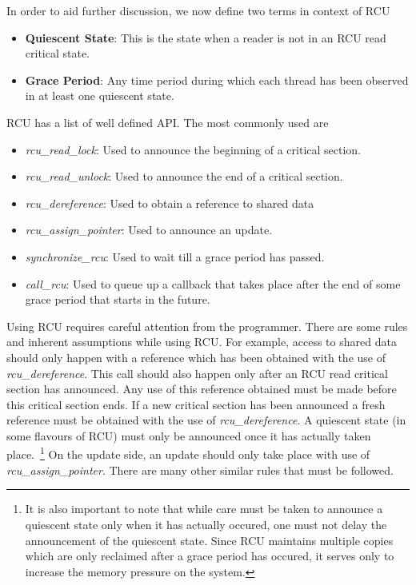 In order to aid further discussion, we now define two terms in context of RCU
\begin{itemize}
\item{\bf Quiescent State}: This is the state when a reader is not in an RCU read critical state.
\item{\bf Grace Period}: Any time period during which each thread has been observed in at least one quiescent state.
\end{itemize}

RCU has a list of well defined API. The most commonly used are
\begin{itemize}
\item\emph{rcu\_read\_lock}: Used to announce the beginning of a critical section.
\item\emph{rcu\_read\_unlock}: Used to announce the end of a critical section.
\item\emph{rcu\_dereference}: Used to obtain a reference to shared data
\item\emph{rcu\_assign\_pointer}: Used to announce an update.
\item\emph{synchronize\_rcu}: Used to wait till a grace period has passed.
\item\emph{call\_rcu}: Used to queue up a callback that takes place after the end of some grace period that starts in the future.
\end{itemize}


Using RCU requires careful attention from the programmer. There are some rules
and inherent assumptions while using RCU. For example, access to shared data
should only happen with a reference which has been obtained with the use of
\emph{rcu\_dereference}. This call should also happen only after an RCU read critical
section has announced. Any use of this reference obtained must be made before
this critical section ends. If a new critical section has been announced a
fresh reference must be obtained with the use of \emph{rcu\_dereference}. A quiescent
state (in some flavours of RCU) must only be announced once it has actually
taken place.~\footnote{It is also important to note that while care must be taken to announce a
quiescent state only when it has actually occured, one must not delay the announcement
of the quiescent state. Since RCU maintains multiple copies which are only reclaimed
after a grace period has occured, it serves only to increase the memory pressure on
the system.} On the update side, an update should only take place with use
of \emph{rcu\_assign\_pointer}. There are many other similar rules that must be
followed.
